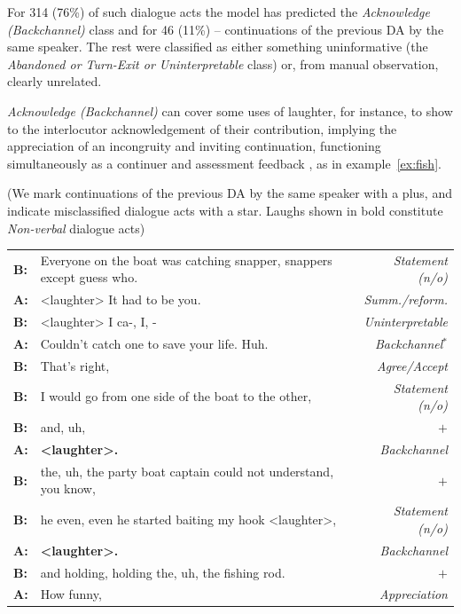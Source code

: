 \documentclass[11pt,a4paper]{article}
\begin{document}
For 314 (76\%) of such dialogue acts the model has predicted the
\emph{Acknowledge (Backchannel)} class and for 46 (11\%) --
continuations of the previous DA by the same speaker. The rest were
classified as either something uninformative (the \emph{Abandoned or
  Turn-Exit or Uninterpretable} class) or, from manual observation,
clearly unrelated.

\emph{Acknowledge (Backchannel)} can cover some uses of laughter, for
instance, to show to the interlocutor acknowledgement of their
contribution, implying the appreciation of an incongruity and
inviting continuation, functioning simultaneously as a continuer and
assessment feedback
\citep{schegloff1982discourse}, as in example~\ref{ex:fish}.

\begin{lingex}
  \small
\item\label{ex:fish}  \small
  (We mark continuations of the previous DA by the same speaker with a plus, and indicate misclassified dialogue acts with a star. Laughs shown in bold constitute \emph{Non-verbal} dialogue acts)\\
    \begin{tabulary}{\linewidth}{@{}>{\bf}lJ>{\em}r@{}}
B: & Everyone on the boat was catching snapper, snappers except guess who. & Statement (n/o)  \\ 
A: & <laughter> It had to be you. & Summ./reform.  \\
B: & <laughter> I ca-, I, - & Uninterpretable \\
A: & Couldn't catch one to save your life. Huh. & %
Backchannel$^*$\\
B: & That's right, & Agree/Accept \\
B: & I would go from one side of the boat to the other, & Statement (n/o) \\
B: & and, uh, & $+$ \\
A: & \bf <laughter>. &Backchannel\\
B: & the, uh, the party boat captain could not understand, you know, & $+$ \\
B: & he even, even he started baiting my hook <laughter>, & Statement (n/o) \\
A: & \bf <laughter>. &Backchannel\\
B: & and holding, holding the, uh, the fishing rod. & $+$\\
A: & How funny, & Appreciation \\
\end{tabulary}
\end{lingex}
\end{document}
